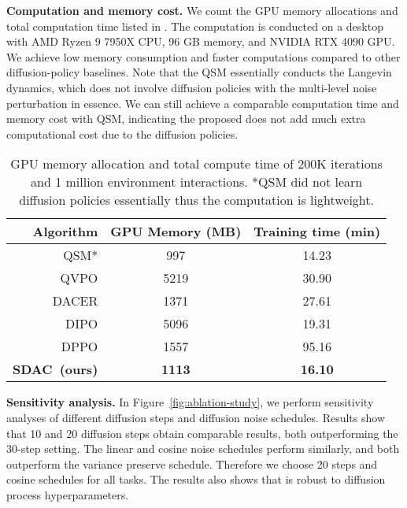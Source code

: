 \textbf{Computation and memory cost.}
We count the GPU memory allocations and total computation time listed in . The computation is conducted on a desktop with AMD Ryzen 9 7950X CPU, 96 GB memory, and NVIDIA RTX 4090 GPU. We achieve low memory consumption and faster computations compared to other diffusion-policy baselines. Note that the QSM essentially conducts the Langevin dynamics, which does not involve diffusion policies with the multi-level noise perturbation in essence. We can still achieve a comparable computation time and memory cost with QSM, indicating the proposed \algabb does not add much extra computational cost due to the diffusion policies.

\begin{table}[ht] 
    \centering
    \caption{GPU memory allocation and total compute time of 200K iterations and 1 million environment interactions. *QSM did not learn diffusion policies essentially thus the computation is lightweight.\label{tab:time}}
    {
    \small
        \begin{tabular}{r|c | c}
    \toprule
         Algorithm &
         GPU Memory (MB)
         & 
         Training time (min)
          \\
         \midrule
         QSM*& 997 & 14.23\\
         \midrule
         QVPO & 5219 & 30.90\\
         DACER &1371 & 27.61\\
         DIPO & 5096 & 19.31\\
         DPPO & 1557 & 95.16\\
         \textbf{SDAC~(ours)} & \textbf{1113} & \textbf{16.10}\\
         \bottomrule
    \end{tabular}
    }
\end{table}

    \textbf{Sensitivity analysis.}
    In Figure~\ref{fig:ablation-study}, we perform sensitivity analyses of different diffusion steps and diffusion noise schedules. Results show that 10 and 20 diffusion steps obtain comparable results, both outperforming the 30-step setting. The linear and cosine noise schedules perform similarly, and both outperform the variance preserve schedule. Therefore we choose 20 steps and cosine schedules for all tasks. The results also shows that \algabb is robust to diffusion process hyperparameters.
    
